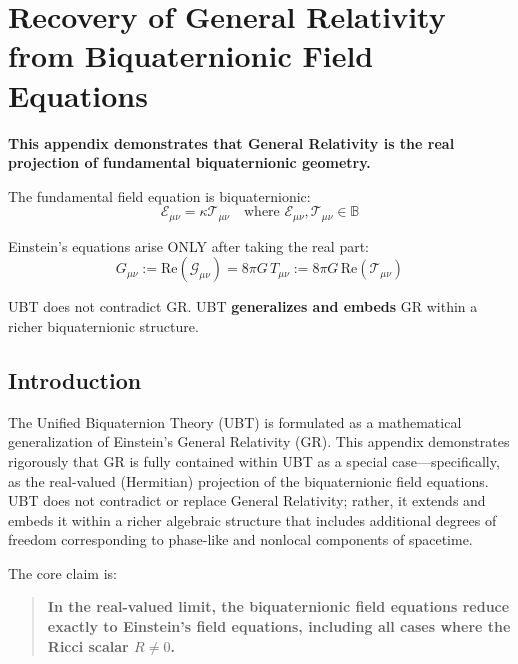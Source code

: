 
\section{Recovery of General Relativity from Biquaternionic Field Equations}

\begin{tcolorbox}[colback=blue!5!white,colframe=blue!75!black,title=Biquaternionic Geometry Lock-In]
\textbf{This appendix demonstrates that General Relativity is the real projection of fundamental biquaternionic geometry.}

The fundamental field equation is biquaternionic:
\begin{equation*}
\mathcal{E}_{\mu\nu} = \kappa \mathcal{T}_{\mu\nu} \quad \text{where } \mathcal{E}_{\mu\nu}, \mathcal{T}_{\mu\nu} \in \mathbb{B}
\end{equation*}

Einstein's equations arise ONLY after taking the real part:
\begin{equation*}
G_{\mu\nu} := \text{Re}(\mathcal{G}_{\mu\nu}) = 8\pi G\, T_{\mu\nu} := 8\pi G\, \text{Re}(\mathcal{T}_{\mu\nu})
\end{equation*}

UBT does not contradict GR. UBT \textbf{generalizes and embeds} GR within a richer biquaternionic structure.
\end{tcolorbox}

\subsection{Introduction}

The Unified Biquaternion Theory (UBT) is formulated as a mathematical generalization of Einstein's General Relativity (GR). This appendix demonstrates rigorously that GR is fully contained within UBT as a special case—specifically, as the real-valued (Hermitian) projection of the biquaternionic field equations. UBT does not contradict or replace General Relativity; rather, it extends and embeds it within a richer algebraic structure that includes additional degrees of freedom corresponding to phase-like and nonlocal components of spacetime.

The core claim is:
\begin{quote}
\textbf{In the real-valued limit, the biquaternionic field equations reduce exactly to Einstein's field equations, including all cases where the Ricci scalar $R \neq 0$.}
\end{quote}


